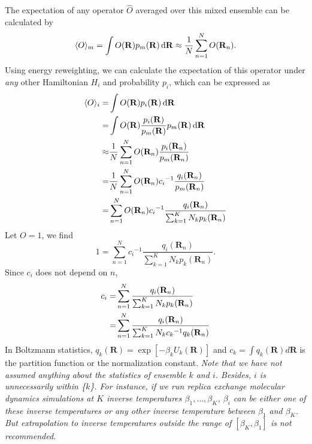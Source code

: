 The expectation of any operator $\hat{O}$ averaged over this mixed ensemble can be calculated by
\begin{equation}
    \langle O\rangle_m=\int O(\mathbf{R})p_m(\mathbf{R})\mathop{}\!\mathrm{d}\mathbf{R}\approx\frac 1N \sum\limits_{n=1}^NO(\mathbf{R}_n).
\end{equation}
Using energy reweighting\cite{TorrieJComputP1977}, we can calculate the expectation of this operator under \emph{any} other Hamiltonian $H_i$ and probability $p_i$, which can be expressed as
\begin{align}
    \langle O\rangle_i=&\int O(\mathbf{R})p_i(\mathbf{R})\mathop{}\!\mathrm{d}\mathbf{R}\notag\\
                      =&\int O(\mathbf{R})\frac{p_i(\mathbf{R})}{p_m(\mathbf{R})}p_m(\mathbf{R})\mathop{}\!\mathrm{d}\mathbf{R}\notag\\
                      \approx&\frac 1N\sum\limits_{n=1}^N O(\mathbf{R}_n)\frac{p_i(\mathbf{R}_n)}{p_m(\mathbf{R}_n)}\notag\\
                      =&\frac 1N\sum\limits_{n=1}^N O(\mathbf{R}_n){c_i}^{-1}\frac{q_i(\mathbf{R}_n)}{p_m(\mathbf{R}_n)}\notag\\
                      =&\sum\limits_{n=1}^N O(\mathbf{R}_n){c_i}^{-1}\frac{q_i(\mathbf{R}_n)}{\sum_{k=1}^{K}N_kp_k(\mathbf{R}_n)}
    \label{Eq:FEM:MBAR:Oexpect}
\end{align}
Let $O=1$, we find
\begin{equation}
    1=\sum\limits_{n=1}^N {c_i}^{-1}\frac{q_i(\mathbf{R}_n)}{\sum_{k=1}^{K}N_kp_k(\mathbf{R}_n)}.
\end{equation}
Since $c_i$ does not depend on $n$,
\begin{align}
    c_i=&\sum\limits_{n=1}^N \frac{q_i(\mathbf{R}_n)}{\sum_{k=1}^{K}N_kp_k(\mathbf{R}_n)}\notag\\
       =&\sum\limits_{n=1}^N \frac{q_i(\mathbf{R}_n)}{\sum_{k=1}^{K}N_k{c_k}^{-1}q_k(\mathbf{R}_n)}
   \label{Eq:FEM:MBAR:c_i}
\end{align}
In Boltzmann statistics, $q_k(\mathbf{R})=\exp{\left[-\beta_kU_k(\mathbf{R})\right]}$ and $c_k=\int q_k(\mathbf{R})d\mathbf{R}$ is the partition function or the normalization constant. \textit{Note that we have not assumed anything about the statistics of ensemble $k$ and $i$. Besides, $i$ is unnecessarily within \{$k$\}. For instance, if we run replica exchange molecular dynamics simulations at $K$ inverse temperatures $\beta_1,\dots,\beta_K$, $\beta_i$ can be either one of these inverse temperatures or any other inverse temperature between $\beta_1$ and $\beta_K$. But extrapolation to inverse temperatures outside the range of $\left[\beta_K,\beta_1\right]$ is not recommended.}

